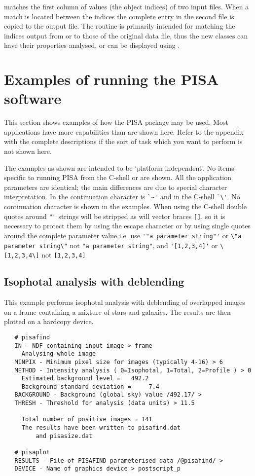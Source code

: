  matches the first column of values (the object indices) of two
input files. When a match is located between the indices the complete
entry in the second file is copied to the output file. The routine is
primarily intended for matching the indices output from  or
 to those of the original  data file, thus the new
classes can have their properties analysed, or can be displayed using
.

\section{Examples of running the PISA software}

This section shows examples of how the PISA package may be used. Most
applications have more capabilities than are shown here. Refer to the
appendix with the complete descriptions if the sort of task which you
want to perform is not shown here.

The examples as shown are intended to be `platform independent'. No
items specific to running PISA from the C-shell or
 are shown.  All the application parameters are
identical; the main differences are due to special character
interpretation. In 
the continuation character is \verb+`~'+
and in the C-shell \verb+`\'+.  No continuation character
is shown in the examples. When using the C-shell double quotes around
\verb+""+ strings will be stripped as will vector braces \verb+[]+, so
it is necessary to protect them by using the escape character or by
using single quotes around the complete parameter value i.e. use
\verb+'"a parameter string"'+ or \verb+\"a parameter string\"+ not
\verb+"a parameter string"+, and
\verb+'[1,2,3,4]'+  or \verb+\[1,2,3,4\]+ not \verb+[1,2,3,4]+

\subsection{Isophotal analysis with deblending}

This example performs isophotal analysis with deblending of overlapped
images on a frame containing a mixture of stars and galaxies.
The results are then plotted on a hardcopy device.
\begin{verbatim}
   # pisafind
   IN - NDF containing input image > frame
     Analysing whole image
   MINPIX - Minimum pixel size for images (typically 4-16) > 6
   METHOD - Intensity analysis ( 0=Isophotal, 1=Total, 2=Profile ) > 0
     Estimated background level =   492.2
     Background standard deviation =     7.4
   BACKGROUND - Background (global sky) value /492.17/ >
   THRESH - Threshold for analysis (data units) > 11.5

     Total number of positive images = 141
     The results have been written to pisafind.dat
         and pisasize.dat

   # pisaplot
   RESULTS - File of PISAFIND parameterised data /@pisafind/ >
   DEVICE - Name of graphics device > postscript_p
\end{verbatim}

